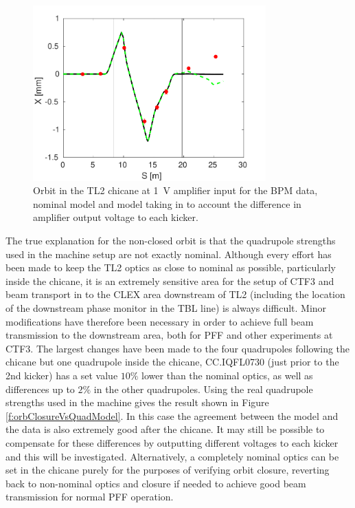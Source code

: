 \begin{figure}
  \centering
  \includegraphics[width=0.8\textwidth]{Figures/commissioning/orbClosureVsAmpModel}
  \caption{Orbit in the TL2 chicane at 1~V amplifier input for the BPM data, nominal model and model taking in to account the difference in amplifier output voltage to each kicker.}
  \label{f:orbClosureVsAmpModel}
\end{figure}

The true explanation for the non-closed orbit is that the quadrupole strengths used in the machine setup are not exactly nominal. Although every effort has been made to keep the TL2 optics as close to nominal as possible, particularly inside the chicane, it is an extremely sensitive area for the setup of CTF3 and beam transport in to the CLEX area downstream of TL2 (including the location of the downstream phase monitor in the TBL line) is always difficult. Minor modifications have therefore been necessary in order to achieve full beam transmission to the downstream area, both for PFF and other experiments at CTF3. The largest changes have been made to the four quadrupoles following the chicane but one quadrupole inside the chicane, CC.IQFL0730 (just prior to the 2nd kicker) has a set value \(10\%\) lower than the nominal optics, as well as differences up to \(2\%\) in the other quadrupoles. Using the real quadrupole strengths used in the machine gives the result shown in Figure \ref{f:orbClosureVsQuadModel}. In this case the agreement between the model and the data is also extremely good after the chicane. It may still be possible to compensate for these differences by outputting different voltages to each kicker and this will be investigated. Alternatively, a completely nominal optics can be set in the chicane purely for the purposes of verifying orbit closure, reverting back to non-nominal optics and closure if needed to achieve good beam transmission for normal PFF operation.

